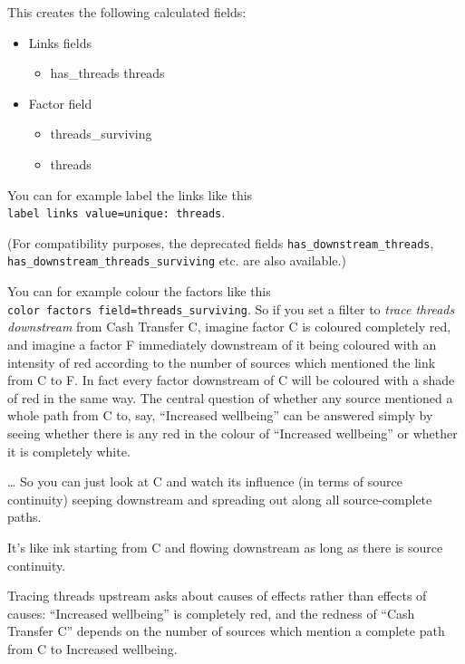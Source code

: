 \documentclass[
]{book}
\providecommand{\tightlist}{%
  \setlength{\itemsep}{0pt}\setlength{\parskip}{0pt}}
\begin{document}
This creates the following calculated fields:

\begin{itemize}
\tightlist
\item
  Links fields

  \begin{itemize}
  \tightlist
  \item
    has\_threads threads
  \end{itemize}
\item
  Factor field

  \begin{itemize}
  \tightlist
  \item
    threads\_surviving
  \item
    threads
  \end{itemize}
\end{itemize}

You can for example label the links like this \texttt{label\ links\ value=unique:\ threads}.

(For compatibility purposes, the deprecated fields \texttt{has\_downstream\_threads}, \texttt{has\_downstream\_threads\_surviving} etc. are also available.)

You can for example colour the factors like this \texttt{color\ factors\ field=threads\_surviving}. So if you set a filter to \emph{trace threads downstream} from Cash Transfer C, imagine factor C is coloured completely red, and imagine a factor F immediately downstream of it being coloured with an intensity of red according to the number of sources which mentioned the link from C to F. In fact every factor downstream of C will be coloured with a shade of red in the same way. The central question of whether any source mentioned a whole path from C to, say, ``Increased wellbeing'' can be answered simply by seeing whether there is any red in the colour of ``Increased wellbeing'' or whether it is completely white.

\ldots{} So you can just look at C and watch its influence (in terms of source continuity) seeping downstream and spreading out along all source-complete paths.

It's like ink starting from C and flowing downstream as long as there is source continuity.

Tracing threads upstream asks about causes of effects rather than effects of causes: ``Increased wellbeing'' is completely red, and the redness of ``Cash Transfer C'' depends on the number of sources which mention a complete path from C to Increased wellbeing.
\end{document}
